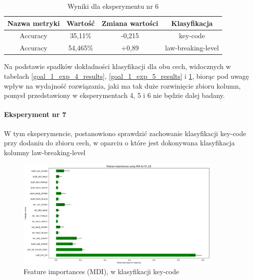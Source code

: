 \documentclass{classrep}
\begin{document}
{{{{                    \begin{table}
                    \centering
                     \begin{tabular}{|c|c|c|c|}
                            \hline
                          Nazwa metryki & Wartość & Zmiana wartości & Klasyfikacja \\ \hline
                            Accuracy &  35,11\% & -0,215 & key-code\\ \hline
                            Accuracy &  54,465\% & +0,89 & law-breaking-level\\ \hline
                        \end{tabular}
                        \caption{Wyniki dla eksperymentu nr 6}
                        \label{goal_1_exp_6_results}
                     \end{table}
                     \FloatBarrier
                    Na podstawie spadków dokładności klasyfikacji dla obu cech,
                    widocznych w tabelach \ref{goal_1_exp_4_results},
                    \ref{goal_1_exp_5_results} i \ref{goal_1_exp_6_results}, biorąc pod
                    uwagę wpływ na wydajność rozwiązania, jaki ma tak duże rozwinięcie
                    zbioru kolumn, pomysł przedstawiony w eksperymentach 4, 5 i 6 nie
                    będzie dalej badany.
                }

                \paragraph{Eksperyment nr 7}{
                    W tym eksperymencie, postanowiono sprawdzić zachowanie klasyfikacji
                    key-code przy dodaniu do zbioru cech, w oparciu o które jest
                    dokonywana klasyfikacja kolumny law-breaking-level
                    \begin{figure}[!htbp]
                        \centering
                        \includegraphics[width=0.9\textwidth]{img/5.1.3/7/Feature importances using MDI for KY_CD.png}
                        \caption{Feature importances (MDI), w klasyfikacji key-code}
                        \label{goal_1_exp_7_imp_mdi_key}
                    \end{figure}
                    
}}}}
\end{document}
